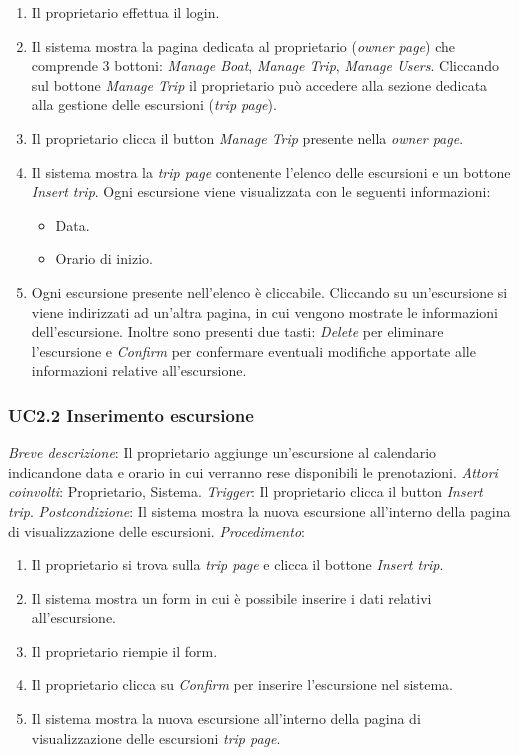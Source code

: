 \begin{enumerate}
    \item Il proprietario effettua il login.
    \item Il sistema mostra la pagina dedicata al proprietario (\textit{owner page}) che comprende 3 bottoni:  \textit{Manage Boat}, \textit{Manage Trip}, \textit{Manage Users}. Cliccando sul bottone  \textit{Manage Trip} il proprietario può accedere alla sezione dedicata alla gestione delle escursioni (\textit{trip page}).
    \item Il proprietario clicca il button \textit{Manage Trip} presente nella \textit{owner page}.
    \item Il sistema mostra la \textit{trip page} contenente l'elenco delle escursioni e un bottone \textit{Insert trip}. 
    Ogni escursione viene visualizzata con le seguenti informazioni:
          \begin{itemize}
              \item Data.
              \item Orario di inizio.
          \end{itemize}
    \item Ogni escursione presente nell'elenco è cliccabile. Cliccando su un'escursione si viene indirizzati ad un'altra pagina, in cui vengono mostrate le informazioni dell'escursione. Inoltre sono presenti due tasti: \textit{Delete} per eliminare l'escursione e \textit{Confirm} per confermare eventuali modifiche apportate alle informazioni relative all'escursione.   
\end{enumerate}

\subsubsection{UC2.2 Inserimento escursione}

 \emph{Breve descrizione}: Il proprietario aggiunge un'escursione al calendario indicandone data e orario in cui verranno rese disponibili le prenotazioni.\medbreak
 \emph{Attori coinvolti}: Proprietario, Sistema.\medbreak
 \emph{Trigger}: Il proprietario clicca il button \textit{Insert trip}.\medbreak
 \emph{Postcondizione}: Il sistema mostra la nuova escursione all'interno della pagina di visualizzazione delle escursioni.\medbreak
 \emph{Procedimento}:

\begin{enumerate}
    \item Il proprietario si trova sulla \textit{trip page} e clicca il bottone \textit{Insert trip}.
    \item Il sistema mostra un form in cui è possibile inserire i dati relativi all'escursione.
    \item Il proprietario riempie il form.
    \item Il proprietario clicca su \textit{Confirm} per inserire l'escursione nel sistema.
    \item Il sistema mostra la nuova escursione all'interno della pagina di visualizzazione delle escursioni \textit{trip page}.
\end{enumerate}


